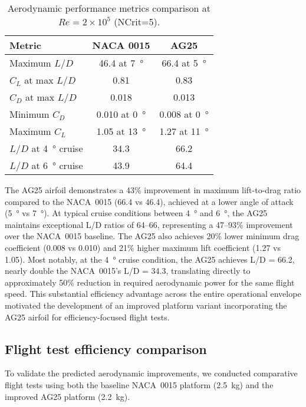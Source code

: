 \begin{table}[htbp]
\centering
\caption{Aerodynamic performance metrics comparison at $Re=2\times10^5$ (NCrit=5).}
\label{tab:airfoil_metrics}
\begin{tabular}{lcc}
\hline
\textbf{Metric} & \textbf{NACA 0015} & \textbf{AG25} \\
\hline
Maximum $L/D$ & 46.4 at \SI{7}{\degree} & 66.4 at \SI{5}{\degree} \\
$C_L$ at max $L/D$ & 0.81 & 0.83 \\
$C_D$ at max $L/D$ & 0.018 & 0.013 \\
Minimum $C_D$ & 0.010 at \SI{0}{\degree} & 0.008 at \SI{0}{\degree} \\
Maximum $C_L$ & 1.05 at \SI{13}{\degree} & 1.27 at \SI{11}{\degree} \\
$L/D$ at \SI{4}{\degree} cruise & 34.3 & 66.2 \\
$L/D$ at \SI{6}{\degree} cruise & 43.9 & 64.4 \\
\hline
\end{tabular}
\end{table}

The AG25 airfoil demonstrates a 43\% improvement in maximum lift-to-drag ratio compared to the NACA~0015 (66.4 vs 46.4), achieved at a lower angle of attack (\SI{5}{\degree} vs \SI{7}{\degree}).
At typical cruise conditions between \SI{4}{\degree} and \SI{6}{\degree}, the AG25 maintains exceptional L/D ratios of 64--66, representing a 47--93\% improvement over the NACA~0015 baseline.
The AG25 also achieves 20\% lower minimum drag coefficient (0.008 vs 0.010) and 21\% higher maximum lift coefficient (1.27 vs 1.05).
Most notably, at the \SI{4}{\degree} cruise condition, the AG25 achieves L/D = 66.2, nearly double the NACA~0015's L/D = 34.3, translating directly to approximately 50\% reduction in required aerodynamic power for the same flight speed.
This substantial efficiency advantage across the entire operational envelope motivated the development of an improved platform variant incorporating the AG25 airfoil for efficiency-focused flight tests.

\subsection{Flight test efficiency comparison}

To validate the predicted aerodynamic improvements, we conducted comparative flight tests using both the baseline NACA~0015 platform (\SI{2.5}{\kg}) and the improved AG25 platform (\SI{2.2}{\kg}).

